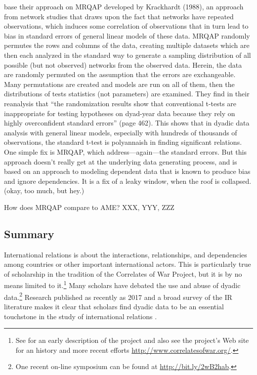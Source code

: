 \citet{erikson:etal:2014} base their approach on MRQAP developed by Krackhardt (1988), \nocite{krackhart:1988} an approach from network studies that draws upon the fact that networks have repeated observations, which induces some correlation of observations that in turn lead to bias in standard errors of general linear models of these data. MRQAP randomly permutes the rows and columns of the data, creating multiple datasets which are then each analyzed in the standard way to generate a sampling distribution of all possible (but not observed) networks from the observed data. Herein, the data are randomly permuted on the assumption that the errors are exchangeable.  Many permutations are created and models are run on all of them, then the distributions of tests statistics (not parameters) are examined. They find in their reanalysis that ``the randomization results show that conventional t-tests are inappropriate for
testing hypotheses on dyad-year data because they rely on highly overconfident standard errors'' (page 462).  This shows that in dyadic data analysis with general linear models, especially with hundreds of thousands of observations, the standard t-test is polyannaish in finding significant relations.  One simple fix is MRQAP, which address---again---the standard errors. But this approach doesn't really get at the underlying data generating process, and is based on an approach to modeling dependent data that is known to produce bias and ignore dependencies.  It is a fix of a leaky window, when the roof is collapsed. (okay, too much, but hey.)

How does MRQAP compare to AME?  XXX, YYY, ZZZ


\subsection*{Summary}
International relations is about the interactions, relationships, and dependencies among countries or other important international actors. This is particularly true of scholarship in the tradition of the Correlates of War Project, but it is by no means limited to it.\footnote{See \cite{singer:1972} for an early description of the project and also see the project's Web site for an history and more recent efforts \url{http://www.correlatesofwar.org/}.} Many scholars have debated the use and abuse of dyadic data.\footnote{One recent on-line symposium can be found at \url{http://bit.ly/2wB2hab}.} Research published as recently as 2017 and a broad survey of the IR literature makes it clear that scholars find dyadic data to be an essential touchstone in the study of international relations \citep{erikson:pinto:2014,aronow:etal:2015}.

